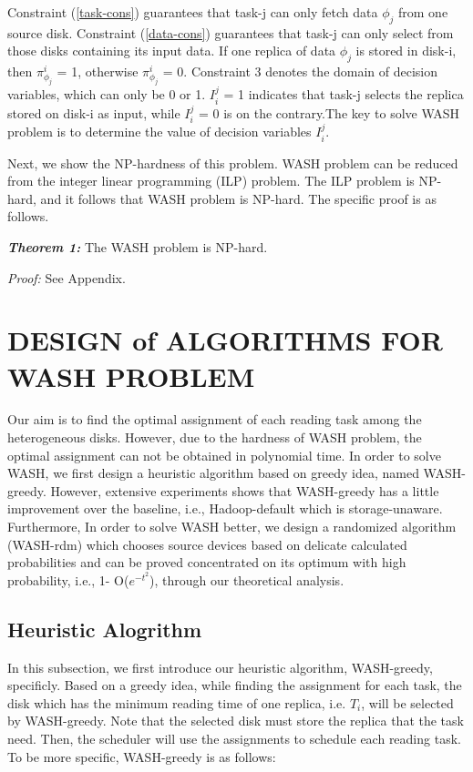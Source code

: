 \documentclass[conference]{IEEEtran}
\begin{document}
Constraint (\ref{task-cons}) guarantees that task-j can only fetch data $\phi_j$ from one source disk. Constraint (\ref{data-cons}) guarantees that task-j can only select from those disks containing its input data. If one replica of data $\phi_j$ is stored in disk-i, then $\pi_{\phi_j}^{i}$ = 1, otherwise $\pi_{\phi_j}^{i}$ = 0. Constraint 3 denotes the domain of decision variables, which can only be 0 or 1. $I_i^j$ = 1 indicates that task-j selects the replica stored on disk-i as input, while $I_i^j$ = 0 is on the contrary.The key to solve WASH problem is to determine the value of decision variables {$I_i^j$}. 

Next, we show the NP-hardness of this problem. WASH problem can be reduced from the integer linear programming (ILP) problem. The ILP problem is NP-hard, and it follows that WASH problem is NP-hard. The specific proof is as follows.

\emph{\textbf{Theorem 1:}} The WASH problem is NP-hard.

\emph{Proof:} See Appendix.


\section{DESIGN of ALGORITHMS FOR WASH PROBLEM}\label{DESIGN_ALGORITHM}

Our aim is to find the optimal assignment of each reading task among the heterogeneous disks. However, due to the hardness of WASH problem, the optimal assignment can not be obtained in polynomial time. In order to solve WASH, we first design a heuristic algorithm based on greedy idea, named WASH-greedy. However, extensive experiments shows that WASH-greedy has a little improvement over the baseline, i.e., Hadoop-default which is storage-unaware. Furthermore, In order to solve WASH better, we design a randomized algorithm (WASH-rdm) which chooses source devices based on delicate calculated probabilities and can be proved concentrated on its optimum with high probability, i.e., 1- O($e^{-t^2}$), through our theoretical analysis.

\subsection{Heuristic Alogrithm}\label{Heuristic}

In this subsection, we first introduce our heuristic algorithm, WASH-greedy, specificly. Based on a greedy idea, while finding the assignment for each task, the disk which has the minimum reading time of one replica, i.e. $T_i$, will be selected by WASH-greedy. Note that the selected disk must store the replica that the task need. Then, the scheduler will use the assignments to schedule each reading task. To be more specific, WASH-greedy is as follows:
\end{document}
